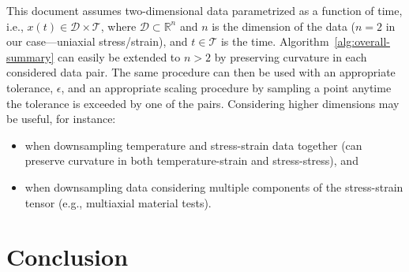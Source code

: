 \documentclass[a4paper,11pt]{article}
\begin{document}
This document assumes two-dimensional data parametrized as a function of time, i.e., $x(t) \in \mathcal{D} \times \mathcal{T}$, where $\mathcal{D} \subset \mathbb{R}^n$ and $n$ is the dimension of the data ($n = 2$ in our case---uniaxial stress/strain), and $t \in \mathcal{T}$ is the time.
Algorithm~\ref{alg:overall-summary} can easily be extended to $n > 2$ by preserving curvature in each considered data pair.
The same procedure can then be used with an appropriate tolerance, $\epsilon$, and an appropriate scaling procedure by sampling a point anytime the tolerance is exceeded by one of the pairs.
Considering higher dimensions may be useful, for instance:
\begin{itemize}
    \item when downsampling temperature and stress-strain data together (can preserve curvature in both temperature-strain and stress-stress), and
    \item when downsampling data considering multiple components of the stress-strain tensor (e.g., multiaxial material tests).
\end{itemize}

\section{Conclusion}
\end{document}
